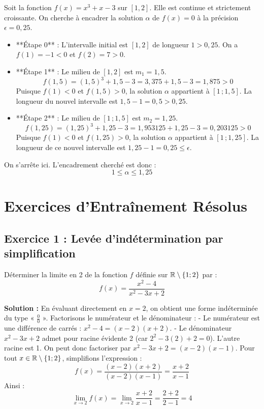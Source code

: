 \begin{exemple}
Soit la fonction $f(x) = x^3 + x - 3$ sur $[1, 2]$. Elle est continue et strictement croissante. On cherche à encadrer la solution $\alpha$ de $f(x) = 0$ à la précision $\epsilon = 0,25$.
\begin{itemize}
    \item **Étape 0** : L'intervalle initial est $[1, 2]$ de longueur $1 > 0,25$. On a $f(1) = -1 < 0$ et $f(2) = 7 > 0$.
    \item **Étape 1** : Le milieu de $[1, 2]$ est $m_1 = 1,5$.
    \[
    f(1,5) = (1,5)^3 + 1,5 - 3 = 3,375 + 1,5 - 3 = 1,875 > 0
    \]
    Puisque $f(1) < 0$ et $f(1,5) > 0$, la solution $\alpha$ appartient à $[1 \,; 1,5]$.
    La longueur du nouvel intervalle est $1,5 - 1 = 0,5 > 0,25$.
    \item **Étape 2** : Le milieu de $[1 \,; 1,5]$ est $m_2 = 1,25$.
    \[
    f(1,25) = (1,25)^3 + 1,25 - 3 = 1,953125 + 1,25 - 3 = 0,203125 > 0
    \]
    Puisque $f(1) < 0$ et $f(1,25) > 0$, la solution $\alpha$ appartient à $[1 \,; 1,25]$.
    La longueur de ce nouvel intervalle est $1,25 - 1 = 0,25 \le \epsilon$.
\end{itemize}
On s'arrête ici. L'encadrement cherché est donc :
\[
1 \le \alpha \le 1,25
\]
\end{exemple}

\section{Exercices d'Entraînement Résolus}

\subsection*{Exercice 1 : Levée d'indétermination par simplification}
Déterminer la limite en 2 de la fonction $f$ définie sur $\mathbb{R} \setminus \{1; 2\}$ par :
\[
f(x) = \frac{x^2 - 4}{x^2 - 3x + 2}
\]

\textbf{Solution :}
En évaluant directement en $x=2$, on obtient une forme indéterminée du type « $\frac{0}{0}$ ».
Factorisons le numérateur et le dénominateur :
- Le numérateur est une différence de carrés : $x^2 - 4 = (x-2)(x+2)$.
- Le dénominateur $x^2 - 3x + 2$ admet pour racine évidente 2 (car $2^2 - 3(2) + 2 = 0$). L'autre racine est 1. On peut donc factoriser par $x^2 - 3x + 2 = (x-2)(x-1)$.
Pour tout $x \in \mathbb{R} \setminus \{1; 2\}$, simplifions l'expression :
\[
f(x) = \frac{(x-2)(x+2)}{(x-2)(x-1)} = \frac{x+2}{x-1}
\]
Ainsi :
\[
\lim_{x \to 2} f(x) = \lim_{x \to 2} \frac{x+2}{x-1} = \frac{2+2}{2-1} = 4
\]

